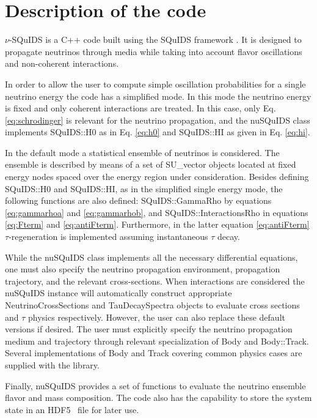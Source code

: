 \documentclass[3p,12pt]{elsarticle}
\newcommand{\ttf}{\ttfamily}
\begin{document}
\section{Description of the code} 
\label{sec:code} 

$\nu$-SQuIDS is a {\ttf C++} code built using the SQuIDS
framework \citep{SQUIDS}. It is designed to propagate neutrinos
through media while taking into account flavor oscillations and
non-coherent interactions. 

In order to allow the user to compute simple oscillation probabilities
for a single neutrino energy the code has a simplified mode.
In this mode the neutrino energy is fixed and only coherent interactions
are treated.
In this case, only Eq. \eqref{eq:schrodinger} is relevant for the
neutrino propagation, and the {\ttf nuSQuIDS} class implements {\ttf
  SQuIDS::H0} as in Eq. \eqref{eq:h0} and {\ttf SQuIDS::HI} as given
in Eq. \eqref{eq:hi}. 

In the default mode a statistical ensemble of neutrinos is
considered. The ensemble is described by means of a set of {\ttf
  SU\_vector} objects located at fixed  energy nodes spaced over the
energy region under consideration. Besides defining {\ttf SQuIDS::H0}
and {\ttf SQuIDS::HI}, as in the simplified single energy mode, the
following functions are also defined: {\ttf SQuIDS::GammaRho} by
equations \eqref{eq:gammarhoa} and \eqref{eq:gammarhob}, and {\ttf
  SQuIDS::InteractionsRho} in equations \eqref{eq:Fterm} and
\eqref{eq:antiFterm}. Furthermore, in the latter equation
\eqref{eq:antiFterm} $\tau$-regeneration is implemented assuming
instantaneous $\tau$ decay.

While the {\ttf nuSQuIDS} class implements all the necessary
differential equations, one must also specify the neutrino propagation
environment, propagation trajectory, and the relevant cross-sections.  
When interactions are considered the {\ttf nuSQuIDS} instance
will automatically construct appropriate {\ttf NeutrinoCrossSections}
and {\ttf TauDecaySpectra} objects to evaluate cross sections and
$\tau$ physics respectively. However, the user can also replace these
default versions if desired. The user must
explicitly specify the neutrino propagation medium and trajectory
through relevant specialization of {\ttf Body} and {\ttf Body::Track}.
Several implementations of {\ttf Body} and {\ttf Track} covering
common physics cases are supplied with the library. 

Finally, {\ttf nuSQuIDS} provides a set of functions to evaluate the
neutrino ensemble flavor and mass composition. The code also has the
capability to store the system state in an HDF5~\citep{folk1999hdf5}
file for later use.
\end{document}
